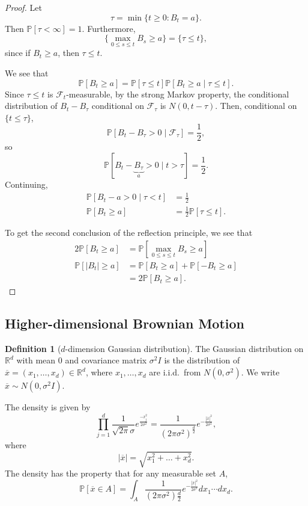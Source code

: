 \documentclass{tufte-handout}
\newcommand*\R{\mathbb{R}}
\renewcommand*\P{\mathbb{P}}
\theoremstyle{definition}
\newtheorem{defn}[thm]{Definition}
\begin{document}
\begin{proof}
	Let \[
		\tau = \min \{t \ge 0 : B_t = a\}
	.\] Then $\P\left[\tau < \infty\right] =1$. Furthermore, \[
		\{\max_{0\le s \le t} B_s \ge a\} = \{\tau \le t\}
	,\] since if $B_t \ge a$, then $\tau \le t$.

	We see that \[
		\P\left[B_t \ge a\right] = \P\left[\tau \le t\right] \P\left[B_t \ge a \mid \tau \le t\right] 
	.\] Since $\tau \le t$ is $\mathscr{F}_t$-measurable, by the strong Markov property, the conditional distribution of $B_t - B_\tau$ conditional on $\mathscr{F}_\tau$ is $N(0,t-\tau)$. Then, conditional on $\{t \le \tau\}$, \[
		\P\left[B_t - B_\tau > 0 \mid \mathscr{F}_\tau\right] = \frac{1}{2}
	,\] so \[
		\P\left[B_t - \underbrace{B_\tau}_{a} > 0 \mid t > \tau\right] = \frac{1}{2}
	.\] Continuing,
	\begin{align*}
		\P\left[B_t - a > 0 \mid \tau < t\right] &= \frac{1}{2} \\
		\P\left[B_t \ge a\right] &= \frac{1}{2}\P\left[\tau \le t\right] 
	.\end{align*}

	To get the second conclusion of the reflection principle, we see that
	\begin{align*}
		2\P\left[B_t \ge a\right] &= \P\left[\max_{0\le s \le t} B_s \ge a\right]  \\
		\P\left[\left| B_t \right| \ge a\right] &= \P\left[B_t \ge a\right] + \P\left[-B_t \ge a\right]  \\
												&= 2\P\left[B_t \ge a\right] 
	.\end{align*}
\end{proof}

\subsection{Higher-dimensional Brownian Motion}
\begin{defn}[$d$-dimension Gaussian distribution]
	The Gaussian distribution on $\R^{d}$ with mean $0$ and covariance matrix $\sigma^2 I$ is the distribution of $\overline{x} = \left( x_1,\ldots,x_d \right) \in \R^d$, where $x_1,\ldots,x_d$ are i.i.d.\ from $N(0,\sigma^2)$. We write $\overline{x} \sim  N(0,\sigma^2 I)$.

	The density is given by \[
		\prod_{j=1}^{d} \frac{1}{\sqrt{2\pi} \sigma} e^{\frac{-x_j^2}{2\sigma^2}} = \frac{1}{\left( 2\pi \sigma^2 \right)^{\frac{d}{2}}} e^{-\frac{\left| \overline{x} \right|^2}{2\sigma^2}} 
	,\] where \[
		\left| \overline{x} \right| = \sqrt{x_1^2 + \ldots + x_d^2} 
	.\] The density has the property that for any measurable set $A$, \[
		\P\left[\overline{x} \in A\right]  = \int_{A}^{}  \frac{1}{\left( 2\pi \sigma^2 \right)\frac{d}{2}} e^{-\frac{\left| \overline{x} \right|^2}{2\sigma^2}} dx_1\cdots dx_d
	.\] 
\end{defn}
\end{document}
